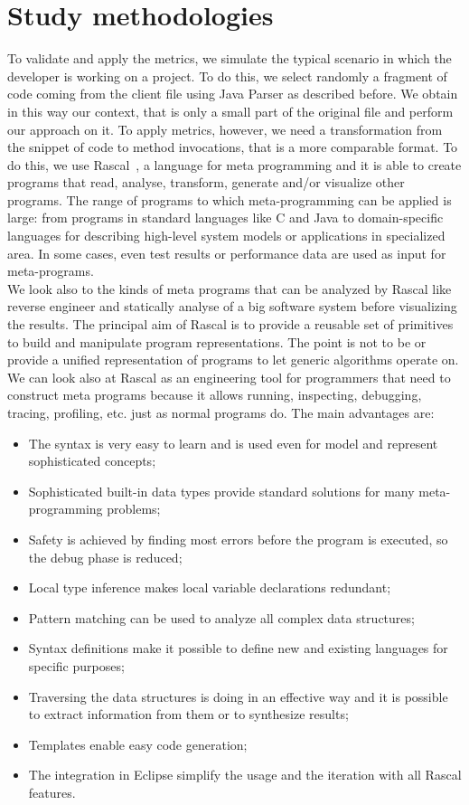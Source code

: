\section{Study methodologies}
To validate and apply the metrics, we simulate the typical scenario in which the developer is working on a project. To do this, we select randomly a fragment of code coming from the client file using Java Parser as described before. We obtain in this way our context, that is only a small part of the original file and perform our approach on it. To apply metrics, however, we need a transformation from the snippet of code to method invocations, that is a more comparable format. To do this, we use Rascal~\cite{utor.rascal-mpl.org/_last_nodate}, a language for meta programming and it is able to create programs that read, analyse, transform, generate and/or visualize other programs. The range of programs to which meta-programming can be applied is large: from programs in standard languages like C and Java to domain-specific languages for describing high-level system models or applications in specialized area. In some cases, even test results or performance data are used as input for meta-programs. \\
We look also to the kinds of meta programs that can be analyzed by Rascal like reverse engineer and statically analyse of a big software system before visualizing the results. The principal aim of Rascal is to provide a reusable set of primitives to build and manipulate program representations. The point is not to be or provide a unified representation of programs to let generic algorithms operate on.  
We can look also at Rascal as an engineering tool for programmers that need to construct meta programs because it allows running, inspecting, debugging, tracing, profiling, etc. just as normal programs do. The main advantages are:
\begin{itemize}
\item The syntax is very easy to learn and is used even for model and represent sophisticated concepts;
\item Sophisticated built-in data types provide standard solutions for many meta-programming problems;
\item Safety is achieved by finding most errors before the program is executed, so the debug phase is reduced;
\item Local type inference makes local variable declarations redundant;
\item Pattern matching can be used to analyze all complex data structures;
\item Syntax definitions make it possible to define new and existing languages for specific purposes;
\item Traversing the data structures is doing in an effective way and it is possible to extract information from them or to synthesize results;
\item Templates enable easy code generation;
\item The integration in Eclipse simplify the usage and the iteration with all Rascal features.
\end{itemize}
